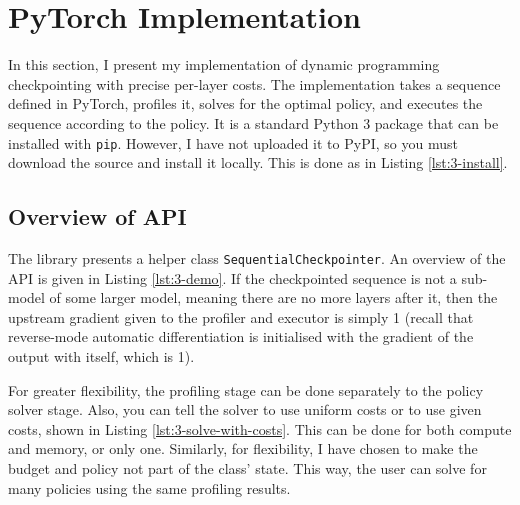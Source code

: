 \section{PyTorch Implementation}
In this section, I present my implementation of dynamic programming checkpointing with precise per-layer costs.
The implementation takes a sequence defined in PyTorch, profiles it, solves for the optimal policy, and executes the sequence according to the policy.
It is a standard Python 3 package that can be installed with \texttt{pip}.
However, I have not uploaded it to PyPI, so you must download the source and install it locally.
This is done as in Listing \ref{lst:3-install}.


\subsection{Overview of API}
The library presents a helper class \texttt{SequentialCheckpointer}.
An overview of the API is given in Listing \ref{lst:3-demo}.
If the checkpointed sequence is not a sub-model of some larger model, meaning there are no more layers after it, then the upstream gradient given to the profiler and executor is simply 1 (recall that reverse-mode automatic differentiation is initialised with the gradient of the output with itself, which is 1).


For greater flexibility, the profiling stage can be done separately to the policy solver stage.
Also, you can tell the solver to use uniform costs or to use given costs, shown in Listing \ref{lst:3-solve-with-costs}.
This can be done for both compute and memory, or only one.
Similarly, for flexibility, I have chosen to make the budget and policy not part of the class' state.
This way, the user can solve for many policies using the same profiling results.


